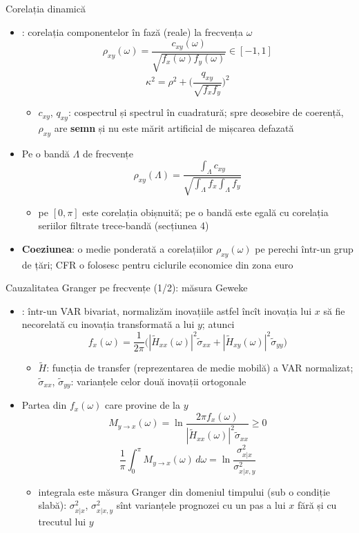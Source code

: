 \begin{frame}{Corelația dinamică}
\itemsize{\small}
\begin{itemize}
    \item {}: corelația componentelor în fază (reale) la frecvența $\omega$
    \[ \rho_{xy}(\omega) = \frac{c_{xy}(\omega)}{\sqrt{f_x(\omega)f_y(\omega)}} \in [-1, 1] \]
    \[ \kappa^2 = \rho^2 + \Big(\frac{q_{xy}}{\sqrt{f_xf_y}}\Big)^2 \]
    \begin{itemize}
        \item $c_{xy}$, $q_{xy}$: cospectrul și spectrul în cuadratură; spre deosebire de coerență, $\rho_{xy}$ are \textbf{semn} și nu este mărit artificial de mișcarea defazată
    \end{itemize}
    \item Pe o bandă $\Lambda$ de frecvențe
    \[ \rho_{xy}(\Lambda) = \frac{\int_\Lambda c_{xy}}{\sqrt{\int_\Lambda f_x\int_\Lambda f_y}} \]
    \begin{itemize}
        \item pe $[0, \pi]$ este corelația obișnuită; pe o bandă este egală cu corelația seriilor filtrate trece-bandă (secțiunea 4)
    \end{itemize}
    \item \textbf{Coeziunea}: o medie ponderată a corelațiilor $\rho_{xy}(\omega)$ pe perechi într-un grup de țări; CFR o folosesc pentru ciclurile economice din zona euro
\end{itemize}
\end{frame}

\begin{frame}{Cauzalitatea Granger pe frecvențe (1/2): măsura Geweke}
\itemsize{\footnotesize}
\begin{itemize}
    \item {}: într-un VAR bivariat, normalizăm inovațiile astfel încît inovația lui $x$ să fie necorelată cu inovația transformată a lui $y$; atunci
    \[ f_x(\omega) = \frac{1}{2\pi}\Big(|\tilde H_{xx}(\omega)|^2\tilde\sigma_{xx} + |\tilde H_{xy}(\omega)|^2\tilde\sigma_{yy}\Big) \]
    \begin{itemize}
        \item $\tilde H$: funcția de transfer (reprezentarea de medie mobilă) a VAR normalizat; $\tilde\sigma_{xx}$, $\tilde\sigma_{yy}$: varianțele celor două inovații ortogonale
    \end{itemize}
    \item Partea din $f_x(\omega)$ care provine de la $y$
    \[ M_{y \to x}(\omega) = \ln\frac{2\pi f_x(\omega)}{|\tilde H_{xx}(\omega)|^2\tilde\sigma_{xx}} \ge 0 \]
    \[ \frac{1}{\pi}\int_0^\pi M_{y \to x}(\omega)\,d\omega = \ln\frac{\sigma^2_{x|x}}{\sigma^2_{x|x,y}} \]
    \begin{itemize}
        \item integrala este măsura Granger din domeniul timpului (sub o condiție slabă): $\sigma^2_{x|x}$, $\sigma^2_{x|x,y}$ sînt varianțele prognozei cu un pas a lui $x$ fără și cu trecutul lui $y$
    \end{itemize}
\end{itemize}
\end{frame}

